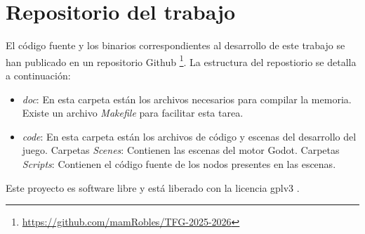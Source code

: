 \section{Repositorio del trabajo}
El código fuente y los binarios correspondientes al desarrollo de este trabajo se han publicado en un repositorio Github \footnote{\url{https://github.com/mamRobles/TFG-2025-2026}}. La estructura del repostiorio se detalla a continuación:
\begin{itemize}
	\item \textit{doc}: En esta carpeta están los archivos necesarios para compilar la memoria. Existe un archivo \textit{Makefile} para facilitar esta tarea.
	\item \textit{code}: En esta carpeta están los archivos de código y escenas del desarrollo del juego.
	\subitem Carpetas \textit{Scenes}: Contienen las escenas del motor Godot.
	\subitem Carpetas \textit{Scripts}: Contienen el código fuente de los nodos presentes en las escenas.
	
\end{itemize} Este proyecto es software libre y está liberado con la licencia gplv3 \cite{QuickGuideGPLv3}.
\newpage
\thispagestyle{empty}
